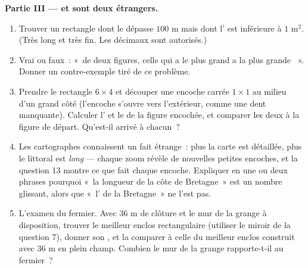 \begin{problem}
\medskip
\noindent\textbf{Partie III ---  et  sont deux
étrangers.}
\begin{enumerate}[resume]
  \item Trouver un rectangle dont le  dépasse $100$ m mais
        dont l' est inférieure à $1$ m$^2$. (Très long et très
        fin. Les décimaux sont autorisés.)
  \item Vrai ou faux~: «~de deux figures, celle qui a le plus grand
         a la plus grande ~». Donner un contre-exemple
        tiré de ce problème.
  \item Prendre le rectangle $6 \times 4$ et découper une encoche
        carrée $1 \times 1$ au milieu d'un grand côté (l'encoche
        s'ouvre vers l'extérieur, comme une dent manquante).
        Calculer l' et le  de la figure encochée, et
        comparer les deux à la figure de départ. Qu'est-il arrivé à
        chacun~?
  \item Les cartographes connaissent un fait étrange~: plus la carte
        est détaillée, plus le littoral est \emph{long} --- chaque
        zoom révèle de nouvelles petites encoches, et la question 13
        montre ce que fait chaque encoche. Expliquer en une ou deux
        phrases pourquoi «~la longueur de la côte de Bretagne~» est
        un nombre glissant, alors que «~l' de la Bretagne~» ne
        l'est pas.
  \item L'examen du fermier. Avec $36$ m de clôture et le mur de la
        grange à disposition, trouver le meilleur enclos
        rectangulaire (utiliser le miroir de la question 7), donner
        son , et la comparer à celle du meilleur enclos
        construit avec $36$ m en plein champ. Combien le mur de la
        grange rapporte-t-il au fermier~?
\end{enumerate}
\end{problem}

